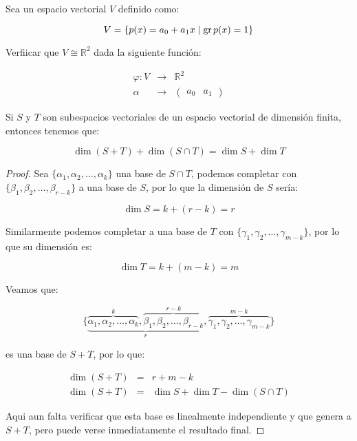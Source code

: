 		\begin{ejercicio}
			Sea un espacio vectorial $V$ definido como:

			\begin{equation*}
				V = \left\{ p(x) = a_0 + a_1 x \mid \operatorname{gr}{p(x)} = 1 \right\}
			\end{equation*}

			Verfiicar que $V \cong \mathbb{R}^2$ dada la siguiente función:

			\begin{eqnarray*}
				\varphi \colon V & \to & \mathbb{R}^2 \\
				\alpha & \to & \begin{pmatrix} a_0 & a_1 \end{pmatrix}
			\end{eqnarray*}
		\end{ejercicio}

		\begin{proposicion}
			Si $S$ y $T$ son subespacios vectoriales de un espacio vectorial de dimensión finita, entonces tenemos que:

			\begin{equation}
				\dim{(S + T)} + \dim{(S \cap T)} = \dim{S} + \dim{T}
			\end{equation}
		\end{proposicion}

		\begin{proof}
			Sea $\{\alpha_1, \alpha_2, \dots, \alpha_k\}$ una base de $S \cap T$, podemos completar con $\{\beta_1, \beta_2, \dots, \beta_{r-k}\}$ a una base de $S$, por lo que la dimensión de $S$ sería:

			\begin{equation*}
				\dim{S} = k + (r - k) = r
			\end{equation*}

			Similarmente podemos completar a una base de $T$ con $\{\gamma_1, \gamma_2, \dots, \gamma_{m-k}\}$, por lo que su dimensión es:

			\begin{equation*}
				\dim{T} = k + (m - k) = m
			\end{equation*}

			Veamos que:

			\begin{equation*}
				\{ \underbrace{\overbrace{\alpha_1, \alpha_2, \dots, \alpha_k}^k, \overbrace{\beta_1, \beta_2, \dots, \beta_{r-k}}^{r-k}}_{r}, \overbrace{\gamma_1, \gamma_2, \dots, \gamma_{m-k}}^{m-k} \}
			\end{equation*}

			es una base de $S + T$, por lo que:

			\begin{eqnarray*}
				\dim{(S + T)} & = & r + m - k \\
				\dim{(S + T)} & = & \dim{S} + \dim{T} - \dim{(S \cap T)}
			\end{eqnarray*}

			Aqui aun falta verificar que esta base es linealmente independiente y que genera a $S + T$, pero puede verse inmediatamente el resultado final.
		\end{proof}

